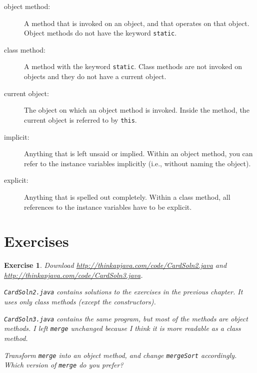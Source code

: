 \documentclass[12pt]{book}
\theoremstyle{exercise}
\newtheorem{exercise}{Exercise}[chapter]
\begin{document}
\begin{description}

\item[object method:]  A method that is invoked on an object,
and that operates on that object.
Object methods do not have the keyword {\tt static}.

\item[class method:]  A method with the keyword {\tt static}.
Class methods are not invoked on objects and they do not have
a current object.

\item[current object:]  The object on which an object method
is invoked.  Inside the method,
the current object is referred to by {\tt this}.


\item[implicit:]  Anything that is left unsaid or implied.  Within
an object method, you can refer to the instance variables
implicitly (i.e., without naming the object).

\item[explicit:]  Anything that is spelled out completely.  Within
a class method, all references to the instance variables have to
be explicit.


\end{description}


\section{Exercises}

\begin{exercise}

Download \url{http://thinkapjava.com/code/CardSoln2.java} and
\url{http://thinkapjava.com/code/CardSoln3.java}.

{\tt CardSoln2.java} contains solutions to the exercises
in the previous chapter.  It uses only class methods (except the
constructors).

{\tt CardSoln3.java} contains the same program, but most of the
methods are object methods.  I left {\tt merge} unchanged because
I think it is more readable as a class method.

Transform {\tt merge} into an object method,
and change {\tt mergeSort} accordingly.  Which version of
{\tt merge} do you prefer?

\end{exercise}
\end{document}

